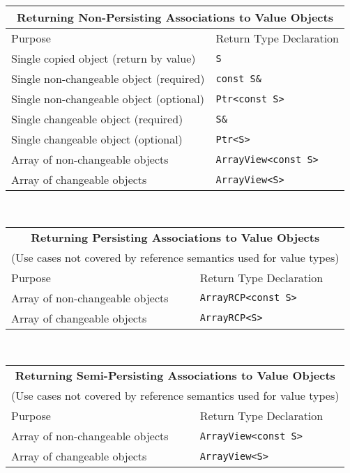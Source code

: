 \begin{tabular}{|l|l|}
%
\multicolumn{2}{c}{\textbf{Returning Non-Persisting Associations to Value Objects}} \\
%
\hline
Purpose
& Return Type Declaration \\
\hline
\hline
Single copied object (return by value)
& {}\texttt{S} \\
\hline
Single non-changeable object (required)
& {}\texttt{const S\&} \\
\hline
Single non-changeable object (optional)
& {}\texttt{Ptr<const S>} \\
\hline
Single changeable object (required)
& {}\texttt{S\&} \\
\hline
Single changeable object (optional)
& {}\texttt{Ptr<S>} \\
\hline
Array of non-changeable objects
& {}\texttt{ArrayView<const S>} \\
\hline
Array of changeable objects
& {}\texttt{ArrayView<S>} \\
\hline
%
\end{tabular} \\[3ex]
%
\begin{tabular}{|l|l|}
%
\multicolumn{2}{c}{\textbf{Returning Persisting Associations to Value Objects}} \\
\multicolumn{2}{c}{(Use cases not covered by reference semantics used for value types)} \\
%
\hline
Purpose
& Return Type Declaration \\
\hline
\hline
Array of non-changeable objects
& {}\texttt{ArrayRCP<const S>} \\
\hline
Array of changeable objects
& {}\texttt{ArrayRCP<S>} \\
\hline
\end{tabular} \\[3ex]
%
\begin{tabular}{|l|l|}
%
\multicolumn{2}{c}{\textbf{Returning Semi-Persisting Associations to Value Objects}} \\
\multicolumn{2}{c}{(Use cases not covered by reference semantics used for value types)} \\
%
\hline
Purpose
& Return Type Declaration \\
\hline
\hline
Array of non-changeable objects
& {}\texttt{ArrayView<const S>} \\
\hline
Array of changeable objects
& {}\texttt{ArrayView<S>} \\
\hline
\end{tabular}

